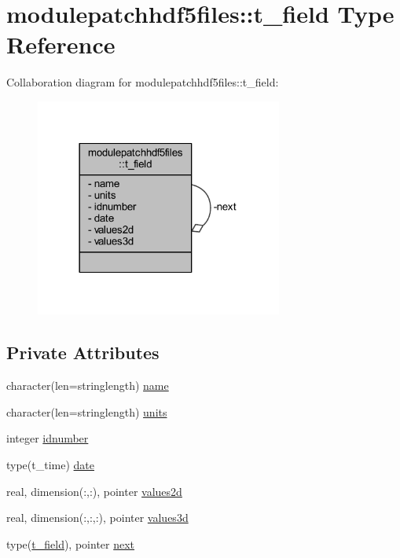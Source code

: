 \hypertarget{structmodulepatchhdf5files_1_1t__field}{}\section{modulepatchhdf5files\+:\+:t\+\_\+field Type Reference}
\label{structmodulepatchhdf5files_1_1t__field}


Collaboration diagram for modulepatchhdf5files\+:\+:t\+\_\+field\+:\nopagebreak
\begin{figure}[H]
\begin{center}
\leavevmode
\includegraphics[width=230pt]{structmodulepatchhdf5files_1_1t__field__coll__graph}
\end{center}
\end{figure}
\subsection*{Private Attributes}
\begin{DoxyCompactItemize}
\item 
character(len=stringlength) \mbox{\hyperlink{structmodulepatchhdf5files_1_1t__field_a8be054c9785901b43fe76c2641c0cf25}{name}}
\item 
character(len=stringlength) \mbox{\hyperlink{structmodulepatchhdf5files_1_1t__field_ac5c760ce0b7c827fe59eadfaadcaafff}{units}}
\item 
integer \mbox{\hyperlink{structmodulepatchhdf5files_1_1t__field_aed22abec059495fbacf05730a7a8d000}{idnumber}}
\item 
type(t\+\_\+time) \mbox{\hyperlink{structmodulepatchhdf5files_1_1t__field_a0e01bda06a7deb7052a22525391620fe}{date}}
\item 
real, dimension(\+:,\+:), pointer \mbox{\hyperlink{structmodulepatchhdf5files_1_1t__field_a817bf9bb3daa21251d195c35310d83ad}{values2d}}
\item 
real, dimension(\+:,\+:,\+:), pointer \mbox{\hyperlink{structmodulepatchhdf5files_1_1t__field_a55c50dcedff1e9f981e814bdff7385bb}{values3d}}
\item 
type(\mbox{\hyperlink{structmodulepatchhdf5files_1_1t__field}{t\+\_\+field}}), pointer \mbox{\hyperlink{structmodulepatchhdf5files_1_1t__field_a4ed3a5ad3abf3f89738169dc0d8614cd}{next}}
\end{DoxyCompactItemize}


